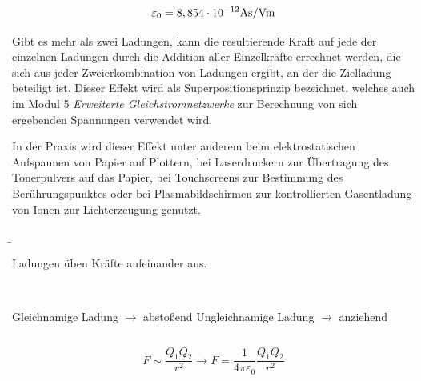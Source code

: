 \begin{frame}
{			\begin{equation*}
				\varepsilon_0 = 8,854 \cdot 10^{-12} \rm{As/Vm}
			\end{equation*}  

			Gibt es mehr als zwei Ladungen, kann die resultierende Kraft auf jede der einzelnen Ladungen durch die
			Addition aller Einzelkräfte errechnet werden, die sich aus jeder Zweierkombination von Ladungen ergibt, an 
			der die Zielladung beteiligt ist. Dieser Effekt wird als Superpositionsprinzip bezeichnet, welches auch im
			 Modul 5 \textit{Erweiterte Gleichstromnetzwerke} zur Berechnung von sich ergebenden Spannungen verwendet wird.

			In der Praxis wird dieser Effekt unter anderem beim elektrostatischen Aufspannen von Papier auf Plottern, 
			bei Laserdruckern zur Übertragung des Tonerpulvers auf das Papier, bei Touchscreens zur
			Bestimmung des Berührungspunktes oder bei Plasmabildschirmen zur kontrollierten 
			Gasentladung von Ionen zur Lichterzeugung genutzt.

		
		}


		\b{
		\hspace{-9pt}Ladungen üben Kräfte aufeinander aus.\\
		\phantom{text}\\
		\begin{columns}
			Gleichnamige Ladung $\rightarrow$ abstoßend 
			Ungleichnamige Ladung $\rightarrow$ anziehend
		\end{columns}
 
		\begin{figure}[h!]
			\centering
			\label{fig:coulomb}

		\end{figure}

		\pause
		\pause
		
	



		\begin{equation*}
			F \sim \frac{Q_1 Q_2}{r^2} \rightarrow F = \frac{1}{4 \pi \varepsilon_0} \frac{Q_1 Q_2}{r^2} 
		\end{equation*}

}
\end{frame}
